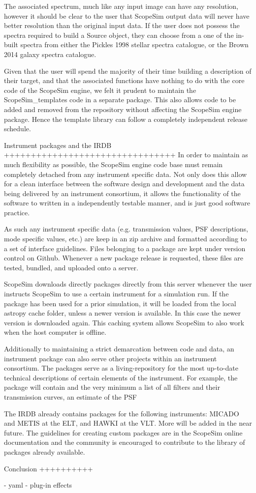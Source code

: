 The associated spectrum, much like any input image can have any resolution,
however it should be clear to the user that ScopeSim output data will never
have better resolution than the original input data. If the user does not
possess the spectra required to build a Source object, they can choose from a
one of the in-built spectra from either the Pickles 1998 stellar spectra
catalogue, or the Brown 2014 galaxy spectra catalogue.

Given that the user will spend the majority of their time building a description
of their target, and that the associated functions have nothing to do with the
core code of the ScopeSim engine, we felt it prudent to maintain the
ScopeSim_templates code in a separate package. This also allows code to be added
and removed from the repository without affecting the ScopeSim engine package.
Hence the template library can follow a completely independent release schedule.


Instrument packages and the IRDB
++++++++++++++++++++++++++++++++
In order to maintain as much flexibility as possible, the ScopeSim engine
code base must remain completely detached from any instrument specific data.
Not only does this allow for a clean interface between the software design and
development and the data being delivered by an instrument consortium, it
allows the functionality of the software to written in a independently testable
manner, and is just good software practice.

As such any instrument specific data (e.g. transmission values, PSF
descriptions, mode specific values, etc.) are keep in an zip archive and
formatted according to a set of interface guidelines. Files belonging to a
package are kept under version control on Github. Whenever a new package release
is requested, these files are tested, bundled, and uploaded onto a server.

ScopeSim downloads directly packages directly from this server whenever the user
instructs ScopeSim to use a certain instrument for a simulation run. If the
package has been used for a prior simulation, it will be loaded from the local
astropy cache folder, unless a newer version is available. In this case the
newer version is downloaded again. This caching system allows ScopeSim to also
work when the host computer is offline.

Additionally to maintaining a strict demarcation between code and data, an
instrument package can also serve other projects within an instrument
consortium. The packages serve as a living-repository for the most up-to-date
technical descriptions of certain elements of the instrument. For example, the
package will contain and the very minimum a list of all filters and their
transmission curves, an estimate of the PSF

The IRDB already contains packages for the following instruments: MICADO and
METIS at the ELT, and HAWKI at the VLT. More will be added in the near future.
The guidelines for creating custom packages are in the ScopeSim online
documentation and the community is encouraged to contribute to the library of
packages already available.


Conclusion
++++++++++



- yaml
- plug-in effects
